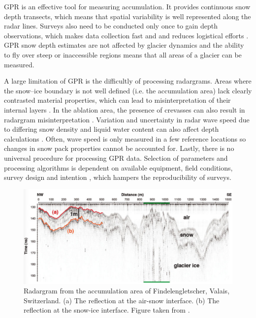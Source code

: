 \documentclass{sfuthesis}
\begin{document}
GPR is an effective tool for measuring accumulation. It provides continuous snow depth transects, which means that spatial variability is well represented along the radar lines. Surveys also need to be conducted only once to gain depth observations, which makes data collection fast and and reduces logistical efforts \citep{Machguth2006}. GPR snow depth estimates are not affected by glacier dynamics and the ability to fly over steep or inaccessible regions means that all areas of a glacier can be measured. 

A large limitation of GPR is the difficultly of processing radargrams. Areas where the snow--ice boundary is not well defined (i.e. the accumulation area) lack clearly contrasted material properties, which can lead to misinterpretation of their internal layers \citep{McGrath2015}. In the ablation area, the presence of crevasses can also result in radargram misinterpretation \citep{Machguth2006}. Variation and uncertainty in radar wave speed due to differing snow density and liquid water content can also affect depth calculations \citep{Sold2013}. Often, wave speed is only measured in a few reference locations so changes in snow pack properties cannot be accounted for. Lastly, there is no universal procedure for processing GPR data. Selection of parameters and processing algorithms is dependent on available equipment, field conditions, survey design and intention \citep{Sold2013}, which hampers the reproducibility of surveys.

\begin{figure}
 \centering
      \includegraphics[width=\textwidth]{gpr.png}
  \caption{Radargram from the accumulation area of Findelengletscher, Valais, Switzerland. (a) The reflection at the air-snow interface. (b) The reflection at the snow-ice interface. Figure taken from \cite{Sold2013}.}
        \label{gpr}
\end{figure}
\end{document}
